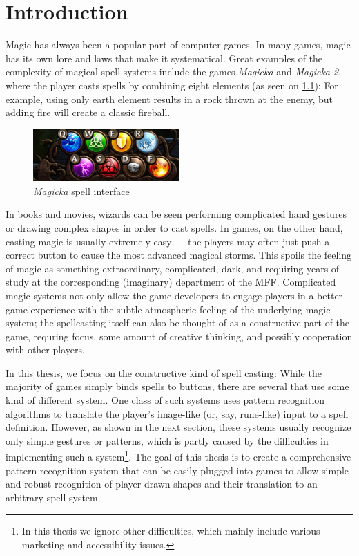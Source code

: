 
\chapter{Introduction}
Magic has always been a popular part of computer games. In many games, magic has its own lore and laws that make it systematical. Great examples of the complexity of magical spell systems include the games \emph{Magicka} and \emph{Magicka 2}, where the player casts spells by combining eight elements (as seen on \cref{fig:magicka}): For example, using only earth element results in a rock thrown at the enemy, but adding fire will create a classic fireball.

\begin{figure}
  \centering
  \includegraphics[width=0.5\textwidth]{ext/magicka.png}
  \caption{\emph{Magicka} spell interface}
  \label{fig:magicka}
\end{figure}

In books and movies, wizards can be seen performing complicated hand gestures or drawing complex shapes in order to cast spells. In games, on the other hand, casting magic is usually extremely easy --- the players may often just push a correct button to cause the most advanced magical storms. This spoils the feeling of magic as something extraordinary, complicated, dark, and requiring years of study at the corresponding (imaginary) department of the MFF. Complicated magic systems not only allow the game developers to engage players in a better game experience with the subtle atmospheric feeling of the underlying magic system; the spellcasting itself can also be thought of as a constructive part of the game, requring focus, some amount of creative thinking, and possibly cooperation with other players.

In this thesis, we focus on the constructive kind of spell casting: While the majority of games simply binds spells to buttons, there are several that use some kind of different system. One class of such systems uses pattern recognition algorithms to translate the player's image-like (or, say, rune-like) input to a spell definition. However, as shown in the next section, these systems usually recognize only simple gestures or patterns, which is partly caused by the difficulties in implementing such a system\footnote{In this thesis we ignore other difficulties, which mainly include various marketing and accessibility issues.}. The goal of this thesis is to create a comprehensive pattern recognition system that can be easily plugged into games to allow simple and robust recognition of player-drawn shapes and their translation to an arbitrary spell system.

